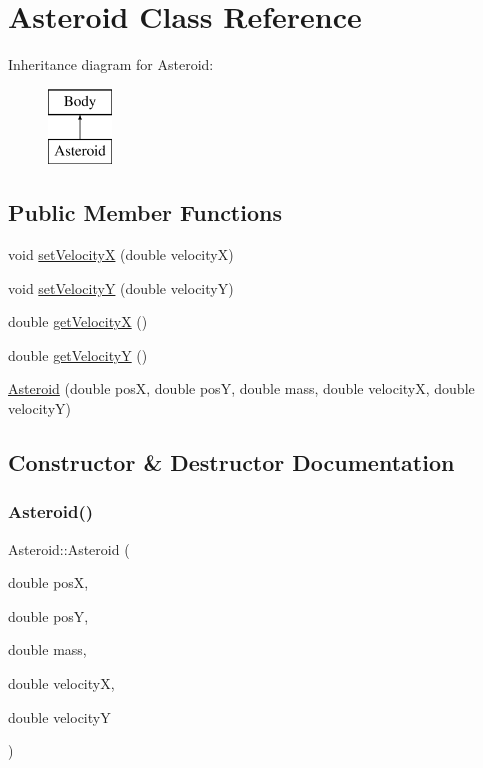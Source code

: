 \hypertarget{class_asteroid}{}\section{Asteroid Class Reference}
\label{class_asteroid}
Inheritance diagram for Asteroid\+:\begin{figure}[H]
\begin{center}
\leavevmode
\includegraphics[height=2.000000cm]{class_asteroid}
\end{center}
\end{figure}
\subsection*{Public Member Functions}
\begin{DoxyCompactItemize}
\item 
void \hyperlink{class_asteroid_add92a2b3252e34bb4565c0d4e0a1ee6d}{set\+VelocityX} (double velocityX)
\item 
void \hyperlink{class_asteroid_a0e915ddddb72eaa3f10f638cd1e567f2}{set\+VelocityY} (double velocityY)
\item 
double \hyperlink{class_asteroid_a193de757c5b2a09dbc60ad5c9e973cac}{get\+VelocityX} ()
\item 
double \hyperlink{class_asteroid_a2dc08e878983626c16ef45626ffab703}{get\+VelocityY} ()
\item 
\hyperlink{class_asteroid_a3d9a9efa0c313401971e99244c58fa01}{Asteroid} (double posX, double posY, double mass, double velocityX, double velocityY)
\end{DoxyCompactItemize}


\subsection{Constructor \& Destructor Documentation}
\mbox{\label{class_asteroid_a3d9a9efa0c313401971e99244c58fa01}} 
\subsubsection{\texorpdfstring{Asteroid()}{Asteroid()}}
{\footnotesize\ttfamily Asteroid\+::\+Asteroid (\begin{DoxyParamCaption}\item[{double}]{posX,  }\item[{double}]{posY,  }\item[{double}]{mass,  }\item[{double}]{velocityX,  }\item[{double}]{velocityY }\end{DoxyParamCaption})}

